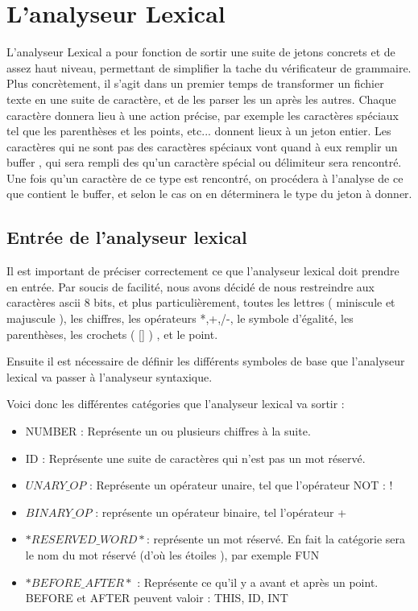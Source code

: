 \chapter{L'analyseur Lexical}

L'analyseur Lexical a pour fonction de sortir une suite de jetons concrets et de assez haut niveau, permettant de simplifier la tache du vérificateur de grammaire. Plus concrètement, il s'agit dans un premier temps de transformer un fichier texte en une suite de caractère, et de les parser les un après les autres. Chaque caractère donnera lieu à une action précise, par exemple les caractères spéciaux tel que les parenthèses et les points, etc... donnent lieux à un jeton entier.
Les caractères qui ne sont pas des caractères spéciaux vont quand à eux remplir un buffer , qui sera rempli des qu'un caractère spécial ou délimiteur sera rencontré. Une fois qu'un caractère de ce type est rencontré, on procédera à l'analyse de ce que contient le buffer, et selon le cas on en déterminera le type du jeton à donner.

\section{Entrée de l'analyseur lexical}

Il est important de préciser correctement ce que l'analyseur lexical doit prendre en entrée. Par soucis de facilité, nous avons décidé de nous restreindre aux caractères ascii 8 bits, et plus particulièrement, toutes les lettres ( miniscule et majuscule ), les chiffres, les opérateurs *,+,/-, le symbole d'égalité, les parenthèses, les crochets ( [] ) ,  et le point.

Ensuite il est nécessaire de définir les différents symboles de base que l'analyseur lexical va passer à l'analyseur syntaxique.

Voici donc les différentes catégories que l'analyseur lexical va sortir :

\begin{itemize}

\item NUMBER  : Représente un ou plusieurs chiffres à la suite.
\item ID : Représente une suite de caractères qui n'est pas un mot réservé.
\item $UNARY\_OP$ : Représente un opérateur unaire, tel que l'opérateur NOT : !
\item $BINARY\_OP$ : représente un opérateur binaire, tel l'opérateur +
\item $*RESERVED\_WORD*$: représente un mot réservé. En fait la catégorie sera le nom du mot réservé (d'où les étoiles ), par exemple FUN
\item $*BEFORE\_AFTER*$ : Représente ce qu'il y a avant et après un point. BEFORE et AFTER peuvent valoir : THIS, ID, INT

\end{itemize}



